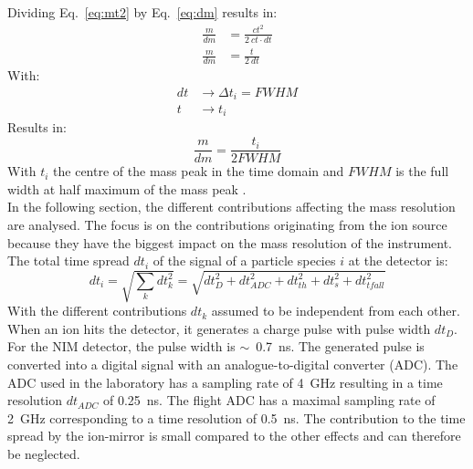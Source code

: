 	Dividing Eq.~\eqref{eq:mt2} by Eq.~\eqref{eq:dm} results in:
	\begin{align}
		\frac{m}{dm} &= \frac{ct^2}{2~ct\cdot dt}\\
		\frac{m}{dm} &= \frac{t}{2~dt}
		\label{eq:massRes}
	\end{align}
	With:
	\begin{align}
		dt &\rightarrow \Delta t_i = FWHM\\
		t &\rightarrow t_i
	\end{align}
	Results in:
	\begin{equation}
		\frac{m}{dm} = \frac{t_i}{2 FWHM}
	\end{equation}
	With $t_i$ the centre of the mass peak in the time domain and $FWHM$ is the full width at half maximum of the mass peak \cite{LecNot_Wurz2017}.\\
	
	In the following section, the different contributions affecting the mass resolution are analysed. The focus is on the contributions originating from the ion source because they have the biggest impact on the mass resolution of the instrument.\\
	The total time spread $dt_i$ of the signal of a particle species $i$ at the detector is:
	\begin{equation}
		dt_i = \sqrt{\sum_{k} dt_k^2} = \sqrt{dt_D^2 + dt_{ADC}^2 + dt_{th}^2 + dt_{s}^2 + dt_{tfall}^2}
		\label{eq:dti}
	\end{equation}
	With the different contributions $dt_k$ assumed to be independent from each other. When an ion hits the detector, it generates a charge pulse with pulse width $dt_D$. For the NIM detector, the pulse width is $\sim$~0.7~ns. The generated pulse is converted into a digital signal with an analogue-to-digital converter (ADC). The ADC used in the laboratory has a sampling rate of 4~GHz resulting in a time resolution $dt_{ADC}$ of 0.25~ns. The flight ADC has a maximal sampling rate of 2~GHz corresponding to a time resolution of 0.5~ns. The contribution to the time spread by the ion-mirror is small compared to the other effects and can therefore be neglected.\\ %

